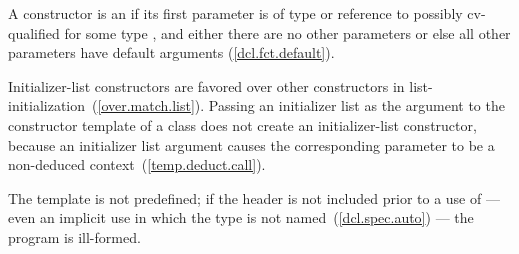 \pnum
A constructor is an  if its first parameter is
of type  or reference to possibly cv-qualified
 for some type , and either there are no other
parameters or else all other parameters have default arguments (\ref{dcl.fct.default}).
\begin{note} Initializer-list constructors are favored over other constructors in
list-initialization~(\ref{over.match.list}). Passing an initializer list as the argument
to the constructor template  of a class  does not
create an initializer-list constructor, because an initializer list argument causes the 
corresponding parameter to be a non-deduced context~(\ref{temp.deduct.call}). \end{note}
The template
 is not predefined; if the header
 is not included prior to a use of
 --- even an implicit use in which the type is not
named~(\ref{dcl.spec.auto}) --- the program is ill-formed.

